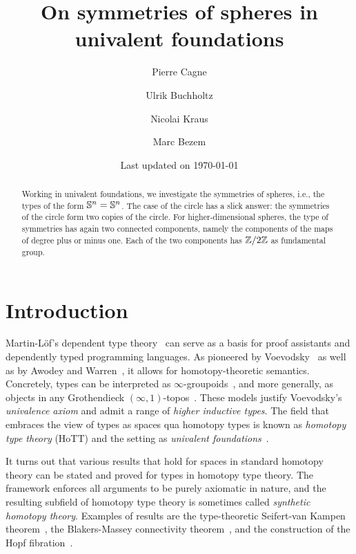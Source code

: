 \documentclass[english,a4paper]{lmcs}
\begin{document}
\title{On symmetries of spheres in univalent foundations}

\author{Pierre Cagne}
\address{Universitetet i Bergen}

\author{Ulrik Buchholtz}
\address{Technische Universit\"at Darmstadt}

\author{Nicolai Kraus}
\address{University of Nottingham}

\author{Marc Bezem}
\address{Universitetet i Bergen}

\date{\normalsize Last updated on \today}%

\begin{abstract}
  Working in univalent foundations,
  we investigate the symmetries of spheres, i.e., the types of the form
  ${\mathbb S^{n}} = {\mathbb S^{n}}$.
  The case of the circle has a slick answer:
  the symmetries of the circle form two copies of the circle.
  For higher-dimensional spheres, the type of symmetries has again two connected components, namely the components of the maps of degree plus or minus one.
  Each of the two components has $\mathbb{Z}/2\mathbb{Z}$ as fundamental group.
\end{abstract}

\maketitle

\section{Introduction}




Martin-L\"of's dependent type theory~\cite{Martin-Lof-1972} can serve as a basis for proof assistants and dependently typed programming languages.
As pioneered by Voevodsky~\cite{voevodsky_univalentfoundations} as well as by Awodey and Warren~\cite{awodeyWarren_HTmodelsOfIT}, it allows for homotopy-theoretic semantics.
Concretely, types can be interpreted as $\infty$-groupoids~\cite{Kapulkin2021}, and more generally,
as objects in any Grothendieck $(\infty,1)$-topos~\cite{shulman2019}.
These models justify Voevodsky's \emph{univalence axiom} and admit a range of \emph{higher inductive types}.
The field that embraces the view of types as spaces qua homotopy types is known as \emph{homotopy type theory} (HoTT) and the setting as \emph{univalent foundations}~\cite{HoTT}.

It turns out that various results that hold for spaces in standard homotopy theory can be stated and proved for types in homotopy type theory.
The framework enforces all arguments to be purely axiomatic in nature, and the resulting subfield of homotopy type theory is sometimes called \emph{synthetic homotopy theory}.
Examples of results are the type-theoretic Seifert-van Kampen theorem~\cite{houfavonia_et_al:LIPIcs:2016:6562}, the Blakers-Massey connectivity theorem~\cite{favonia_blakers}, and the construction of the Hopf fibration~\cite[Ch.~8.5]{HoTT}.
\end{document}
